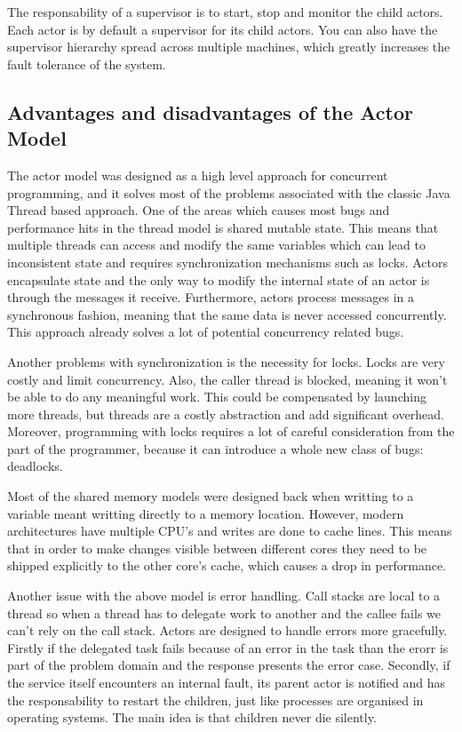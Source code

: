 \documentclass[12pt]{article}
\begin{document}
	The responsability of a supervisor is to start, stop and monitor the child actors\cite{ScalaInAction}. 
	Each actor is by default a supervisor for its child actors. You can also have the supervisor 
	hierarchy spread across multiple machines, which greatly increases the fault tolerance 
	of the system.

	\subsection{Advantages and disadvantages of the Actor Model}
	The actor model was designed as a high level approach for concurrent programming,
	and it solves most of the problems associated with the classic Java Thread based approach\cite{AkkaDocs}.
	One of the areas which causes most bugs and performance hits in the thread model is shared mutable 
	state. This means that multiple threads can access and modify the same variables which can 
	lead to inconsistent state and requires synchronization mechanisms such as locks.
	Actors encapsulate state and the only way to modify the internal state of an actor 
	is through the messages it receive. Furthermore, actors process messages in a synchronous 
	fashion, meaning that the same data is never accessed concurrently. This approach already 
	solves a lot of potential concurrency related bugs. 
	
	Another problems with synchronization 
	is the necessity for locks. Locks are very costly and limit concurrency. Also, the 
	caller thread is blocked, meaning it won't be able to do any meaningful work. This could be 
	compensated by launching more threads, but threads are a costly abstraction and add significant 
	overhead. Moreover, programming with locks requires a lot of careful consideration from the 
	part of the programmer, because it can introduce a whole new class of bugs: deadlocks.
	
	Most of the shared memory models were designed back when writting to a variable meant 
	writting directly to a memory location. However, modern architectures have multiple CPU's 
	and writes are done to cache lines. This means that in order to make changes visible 
	between different cores they need to be shipped explicitly to the other core's cache, 
	which causes a drop in performance.

	Another issue with the above model is error handling\cite{AkkaDocs}. Call stacks are local to a thread 
	so when a thread has to delegate work to another and the callee fails we can't rely 
	on the call stack. Actors are designed to handle errors more gracefully. Firstly if 
	the delegated task fails because of an error in the task than the erorr is part of the 
	problem domain and the response presents the error case. Secondly, if the service itself 
	encounters an internal fault, its parent actor is notified and has the responsability
	to restart the children, just like processes are organised in operating systems. The main 
	idea is that children never die silently.
\end{document}
